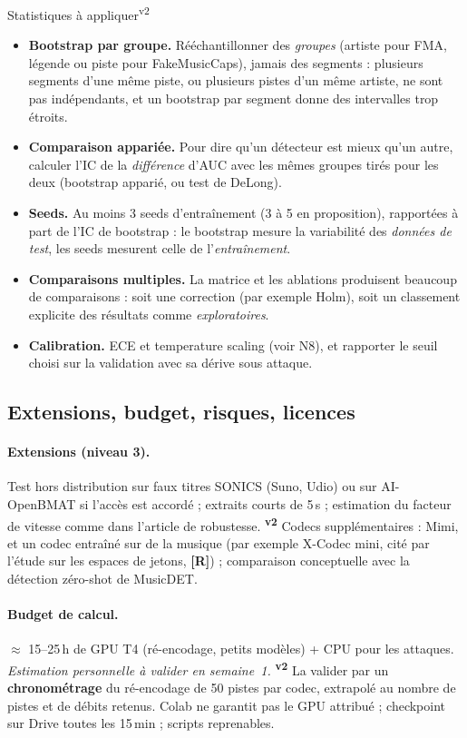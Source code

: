 \documentclass[11pt,a4paper]{article}
\providecommand{\og}{\guillemotleft\nobreakspace}%
\providecommand{\fg}{\nobreakspace\guillemotright}}
\newcommand{\vtwo}{\textsuperscript{\textcolor{orange!80!black}{\textbf{v2}}}}
\newcommand{\lR}{\textbf{\textcolor{orange!80!black}{[R]}}}
\newcommand{\vtwot}{\textsuperscript{v2}}  %
\begin{document}
\begin{corr}{Statistiques à appliquer\vtwot}
\begin{itemize}
\item \textbf{Bootstrap par groupe.} Rééchantillonner des \emph{groupes} (artiste pour FMA, légende ou piste pour FakeMusicCaps), jamais des segments : plusieurs segments d'une même piste, ou plusieurs pistes d'un même artiste, ne sont pas indépendants, et un bootstrap par segment donne des intervalles trop étroits.
\item \textbf{Comparaison appariée.} Pour dire qu'un détecteur est \og{}mieux\fg{} qu'un autre, calculer l'IC de la \emph{différence} d'AUC avec les mêmes groupes tirés pour les deux (bootstrap apparié, ou test de DeLong).
\item \textbf{Seeds.} Au moins 3 seeds d'entraînement (3 à 5 en proposition), rapportées à part de l'IC de bootstrap : le bootstrap mesure la variabilité des \emph{données de test}, les seeds mesurent celle de l'\emph{entraînement}.
\item \textbf{Comparaisons multiples.} La matrice et les ablations produisent beaucoup de comparaisons : soit une correction (par exemple Holm), soit un classement explicite des résultats comme \emph{exploratoires}.
\item \textbf{Calibration.} ECE et temperature scaling (voir N8), et rapporter le seuil choisi sur la validation avec sa dérive sous attaque.
\end{itemize}
\end{corr}

\subsection{Extensions, budget, risques, licences}\label{sec:ext}

\paragraph{Extensions (niveau 3).} Test hors distribution sur faux titres SONICS (Suno, Udio) ou sur AI-OpenBMAT si l'accès est accordé ; extraits courts de 5\,s ; estimation du facteur de vitesse comme dans l'article de robustesse. \vtwo{} Codecs supplémentaires : Mimi, et un codec entraîné sur de la musique (par exemple X-Codec mini, cité par l'étude sur les espaces de jetons, \lR) ; comparaison conceptuelle avec la détection \og{}zéro-shot\fg{} de MusicDET.

\paragraph{Budget de calcul.}\label{sec:budget} $\approx$ 15--25\,h de GPU T4 (ré-encodage, petits modèles) + CPU pour les attaques. \textit{Estimation personnelle à valider en semaine~1.} \vtwo{} La valider par un \textbf{chronométrage} du ré-encodage de 50 pistes par codec, extrapolé au nombre de pistes et de débits retenus. Colab ne garantit pas le GPU attribué ; checkpoint sur Drive toutes les 15\,min ; scripts reprenables.
\end{document}
